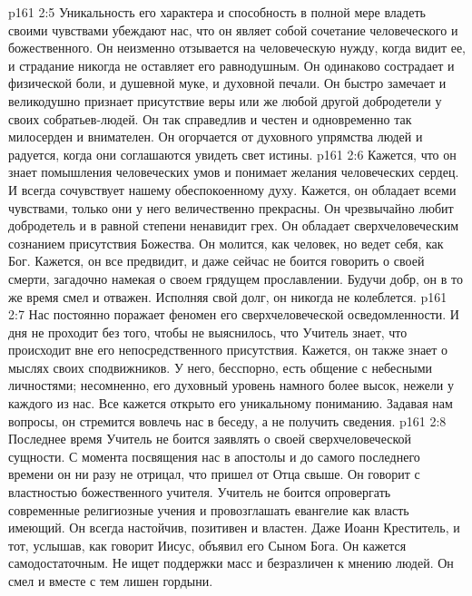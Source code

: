 \vs p161 2:5 \pc {}\bibnobreakspace Уникальность его характера и способность в полной мере владеть своими чувствами убеждают нас, что он являет собой сочетание человеческого и божественного. Он неизменно отзывается на человеческую нужду, когда видит ее, и страдание никогда не оставляет его равнодушным. Он одинаково сострадает и физической боли, и душевной муке, и духовной печали. Он быстро замечает и великодушно признает присутствие веры или же любой другой добродетели у своих собратьев\hyp{}людей. Он так справедлив и честен и одновременно так милосерден и внимателен. Он огорчается от духовного упрямства людей и радуется, когда они соглашаются увидеть свет истины.
\vs p161 2:6 \pc {}\bibnobreakspace Кажется, что он знает помышления человеческих умов и понимает желания человеческих сердец. И всегда сочувствует нашему обеспокоенному духу. Кажется, он обладает всеми чувствами, только они у него величественно прекрасны. Он чрезвычайно любит добродетель и в равной степени ненавидит грех. Он обладает сверхчеловеческим сознанием присутствия Божества. Он молится, как человек, но ведет себя, как Бог. Кажется, он все предвидит, и даже сейчас не боится говорить о своей смерти, загадочно намекая о своем грядущем прославлении. Будучи добр, он в то же время смел и отважен. Исполняя свой долг, он никогда не колеблется.
\vs p161 2:7 \pc {}\bibnobreakspace Нас постоянно поражает феномен его сверхчеловеческой осведомленности. И дня не проходит без того, чтобы не выяснилось, что Учитель знает, что происходит вне его непосредственного присутствия. Кажется, он также знает о мыслях своих сподвижников. У него, бесспорно, есть общение с небесными личностями; несомненно, его духовный уровень намного более высок, нежели у каждого из нас. Все кажется открыто его уникальному пониманию. Задавая нам вопросы, он стремится вовлечь нас в беседу, а не получить сведения.
\vs p161 2:8 \pc {}\bibnobreakspace Последнее время Учитель не боится заявлять о своей сверхчеловеческой сущности. С момента посвящения нас в апостолы и до самого последнего времени он ни разу не отрицал, что пришел от Отца свыше. Он говорит с властностью божественного учителя. Учитель не боится опровергать современные религиозные учения и провозглашать евангелие как власть имеющий. Он всегда настойчив, позитивен и властен. Даже Иоанн Креститель, и тот, услышав, как говорит Иисус, объявил его Сыном Бога. Он кажется самодостаточным. Не ищет поддержки масс и безразличен к мнению людей. Он смел и вместе с тем лишен гордыни.
